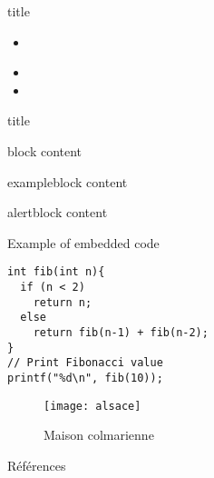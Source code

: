 


\frame[plain]{\titlepage} 
	
\begin{frame}{title}
\begin{itemize}
	\item {}\cite{Feynman1941}
	\item {}
	\item {}
\end{itemize}
\end{frame}

\begin{frame}{title}
\begin{block}{block}
	content
\end{block}
\begin{exampleblock}{exampleblock}
content
\end{exampleblock}
\begin{alertblock}{alertblock}
content
\end{alertblock}
\end{frame}

\begin{frame}[fragile]{Example of embedded code}
\begin{lstlisting}[style=customc]
int fib(int n){
  if (n < 2)
    return n;
  else
    return fib(n-1) + fib(n-2);
}
// Print Fibonacci value
printf("%d\n", fib(10));
\end{lstlisting}
\end{frame}

\begin{frame}{}
\begin{figure}[htbp]
\centering
\texttt{[image: alsace]}
\caption{Maison colmarienne}
\end{figure}
\end{frame}

\begin{frame}{Références}
\printbibliography
\end{frame}
